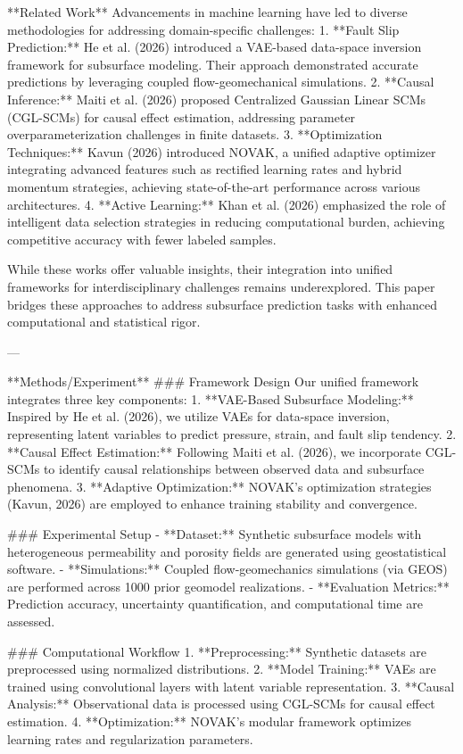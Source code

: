 **Related Work**  
Advancements in machine learning have led to diverse methodologies for addressing domain-specific challenges:  
1. **Fault Slip Prediction:** He et al. (2026) introduced a VAE-based data-space inversion framework for subsurface modeling. Their approach demonstrated accurate predictions by leveraging coupled flow-geomechanical simulations.  
2. **Causal Inference:** Maiti et al. (2026) proposed Centralized Gaussian Linear SCMs (CGL-SCMs) for causal effect estimation, addressing parameter overparameterization challenges in finite datasets.  
3. **Optimization Techniques:** Kavun (2026) introduced NOVAK, a unified adaptive optimizer integrating advanced features such as rectified learning rates and hybrid momentum strategies, achieving state-of-the-art performance across various architectures.  
4. **Active Learning:** Khan et al. (2026) emphasized the role of intelligent data selection strategies in reducing computational burden, achieving competitive accuracy with fewer labeled samples.  

While these works offer valuable insights, their integration into unified frameworks for interdisciplinary challenges remains underexplored. This paper bridges these approaches to address subsurface prediction tasks with enhanced computational and statistical rigor.

---

**Methods/Experiment**  
### Framework Design  
Our unified framework integrates three key components:  
1. **VAE-Based Subsurface Modeling:** Inspired by He et al. (2026), we utilize VAEs for data-space inversion, representing latent variables to predict pressure, strain, and fault slip tendency.  
2. **Causal Effect Estimation:** Following Maiti et al. (2026), we incorporate CGL-SCMs to identify causal relationships between observed data and subsurface phenomena.  
3. **Adaptive Optimization:** NOVAK’s optimization strategies (Kavun, 2026) are employed to enhance training stability and convergence.

### Experimental Setup  
- **Dataset:** Synthetic subsurface models with heterogeneous permeability and porosity fields are generated using geostatistical software.  
- **Simulations:** Coupled flow-geomechanics simulations (via GEOS) are performed across 1000 prior geomodel realizations.  
- **Evaluation Metrics:** Prediction accuracy, uncertainty quantification, and computational time are assessed.

### Computational Workflow  
1. **Preprocessing:** Synthetic datasets are preprocessed using normalized distributions.  
2. **Model Training:** VAEs are trained using convolutional layers with latent variable representation.  
3. **Causal Analysis:** Observational data is processed using CGL-SCMs for causal effect estimation.  
4. **Optimization:** NOVAK’s modular framework optimizes learning rates and regularization parameters.

